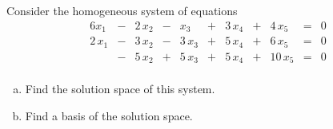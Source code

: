 
\begin{exerciseStatement}


Consider the homogeneous system of equations 
\begin{alignat*}{6} x_{1} &-& 2 \, x_{2} &-& x_{3} &+& 3 \, x_{4} &+& 4 \, x_{5} &=& 0 \\2 \, x_{1} &-& 3 \, x_{2} &-& 3 \, x_{3} &+& 5 \, x_{4} &+& 6 \, x_{5} &=& 0 \\ &-& 5 \, x_{2} &+& 5 \, x_{3} &+& 5 \, x_{4} &+& 10 \, x_{5} &=& 0 \\ \end{alignat*}
            


\begin{enumerate}[(a)]
\item  Find the solution space of this system.
\item  Find a basis of the solution space.
\end{enumerate}
    
\end{exerciseStatement}
    
